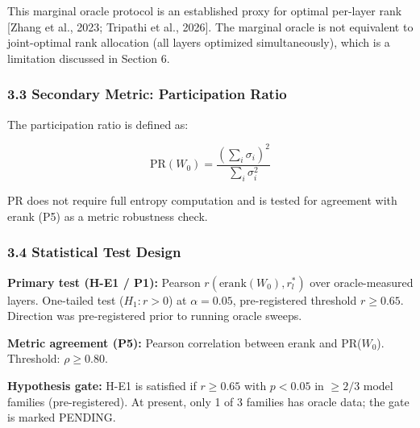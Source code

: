 This marginal oracle protocol is an established proxy for optimal per-layer rank [Zhang et al., 2023; Tripathi et al., 2026]. The marginal oracle is not equivalent to joint-optimal rank allocation (all layers optimized simultaneously), which is a limitation discussed in Section 6.

\subsubsection{3.3 Secondary Metric: Participation Ratio}

The participation ratio is defined as:

$$\text{PR}(W_0) = \frac{(\sum_i \sigma_i)^2}{\sum_i \sigma_i^2}$$

PR does not require full entropy computation and is tested for agreement with erank (P5) as a metric robustness check.

\subsubsection{3.4 Statistical Test Design}

\textbf{Primary test (H-E1 / P1):} Pearson $r(\text{erank}(W_0), r_l^*)$ over oracle-measured layers. One-tailed test ($H_1: r > 0$) at $\alpha = 0.05$, pre-registered threshold $r \geq 0.65$. Direction was pre-registered prior to running oracle sweeps.

\textbf{Metric agreement (P5):} Pearson correlation between erank and PR($W_0$). Threshold: $\rho \geq 0.80$.

\textbf{Hypothesis gate:} H-E1 is satisfied if $r \geq 0.65$ with $p < 0.05$ in $\geq 2/3$ model families (pre-registered). At present, only 1 of 3 families has oracle data; the gate is marked PENDING.

